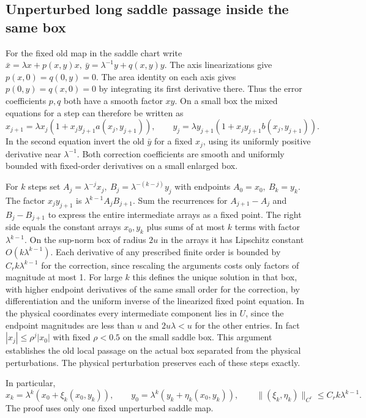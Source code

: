 \documentclass[11pt]{article}
\begin{document}
\subsection{Unperturbed long saddle passage inside the same
box}\label{unperturbed-long-saddle-passage-inside-the-same-box}

For the fixed old map in the saddle chart write
\(\bar x=\lambda x+p(x,y)x,\ \bar y=\lambda^{-1}y+q(x,y)y\). The axis
linearizations give \(p(x,0)=q(0,y)=0\). The area identity on each axis gives
\(p(0,y)=q(x,0)=0\) by integrating its first derivative there. Thus the error
coefficients \(p,q\) both have a smooth factor \(xy\). On a small box the mixed
equations for a step can therefore be written as \[
 x_{j+1}=\lambda x_j(1+x_j y_{j+1}a(x_j,y_{j+1})),
 \qquad y_j=\lambda y_{j+1}(1+x_j y_{j+1}b(x_j,y_{j+1})).
\] In the second equation invert the old \(\bar y\) for a fixed \(x_j\), using
its uniformly positive derivative near \(\lambda^{-1}\). Both correction
coefficients are smooth and uniformly bounded with fixed-order derivatives on a
small enlarged box.

For \(k\) steps set \(A_j=\lambda^{-j}x_j,\ B_j=\lambda^{-(k-j)}y_j\) with
endpoints \(A_0=x_0,\ B_k=y_k\). The factor \(x_jy_{j+1}\) is
\(\lambda^{k-1}A_jB_{j+1}\). Sum the recurrences for \(A_{j+1}-A_j\) and
\(B_j-B_{j+1}\) to express the entire intermediate arrays as a fixed point. The
right side equals the constant arrays \(x_0,y_k\) plus sums of at most \(k\)
terms with factor \(\lambda^{k-1}\). On the sup-norm box of radius \(2u\) in the
arrays it has Lipschitz constant \(O(k\lambda^{k-1})\). Each derivative of any
prescribed finite order is bounded by \(C_r k\lambda^{k-1}\) for the correction,
since rescaling the arguments costs only factors of magnitude at most 1. For
large \(k\) this defines the unique solution in that box, with higher endpoint
derivatives of the same small order for the correction, by differentiation and
the uniform inverse of the linearized fixed point equation. In the physical
coordinates every intermediate component lies in \(U\), since the endpoint
magnitudes are less than \(u\) and \(2u\lambda<u\) for the other entries. In
fact \(|x_j|\le \rho^j|x_0|\) with fixed \(\rho<0.5\) on the small saddle box.
This argument establishes the old local passage on the actual box separated from
the physical perturbations. The physical perturbation preserves each of these
steps exactly.

In particular, \[
 x_k=\lambda^k(x_0+\xi_k(x_0,y_k)),\qquad
 y_0=\lambda^k(y_k+\eta_k(x_0,y_k)),
 \qquad
 \|(\xi_k,\eta_k)\|_{C^r}\le C_r k\lambda^{k-1}.
\] The proof uses only one fixed unperturbed saddle map.
\end{document}
